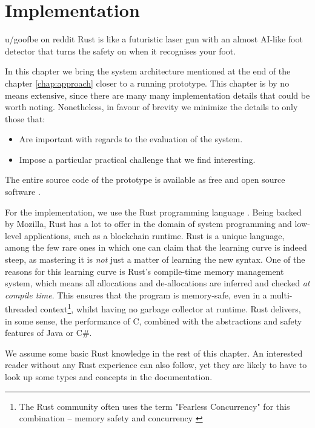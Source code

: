 \chapter{Implementation} \label{chap:impl}

\begin{chapquote}{u/goofbe on reddit}
	Rust is like a futuristic laser gun with an almost AI-like foot detector that turns the safety
	on when it recognises your foot.
\end{chapquote}

In this chapter we bring the system architecture mentioned at the end of the chapter
\ref{chap:approach} closer to a running prototype. This chapter is by no means
extensive, since there are many many implementation details that could be worth noting. Nonetheless,
in favour of brevity we minimize the details to only those that:

\begin{itemize}
	\item Are important with regards to the evaluation of the system.
	\item Impose a particular practical challenge that we find interesting.
\end{itemize}

The entire source code of the prototype is available as free and open source software
\cite{paimaniKianenigmaSubSonic2020}.

For the implementation, we use the Rust programming language
\cite{klabnikRustProgrammingLanguage2019}. Being backed by Mozilla, Rust has a lot to offer in the
domain of system programming and low-level applications, such as a blockchain runtime. Rust is a
unique language, among the few rare ones in which one can claim that the learning curve is indeed
steep, as mastering it is \textit{not} just a matter of learning the new syntax. One of the reasons
for this learning curve is Rust's compile-time memory management system, which means all allocations
and de-allocations are inferred and checked \textit{at compile time}. This ensures that the program
is memory-safe, even in a multi-threaded context\footnote{The Rust community often uses the term
"Fearless Concurrency" for this combination -- memory safety and concurrency
\cite{FearlessConcurrencyRust}}, whilst having no garbage collector at runtime. Rust delivers, in
some sense, the performance of C, combined with the abstractions and safety features of Java or
C\#\cite{jungRustBeltSecuringFoundations2017}.

\begin{remark}
	We assume some basic Rust knowledge in the rest of this chapter. An interested reader without
	any Rust experience can also follow, yet they are likely to have to look up some types and
	concepts in the documentation.
\end{remark}

